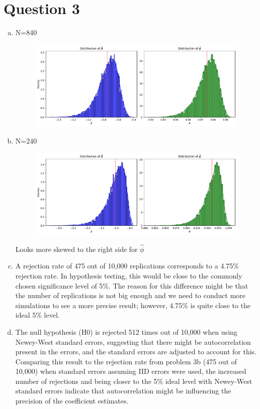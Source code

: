 
\section*{Question 3}

\begin{enumerate}[(a)]
    \item
    N=840\\
    \begin{figure}[h]
        \centering
        \includegraphics[width=0.9\linewidth]{Out/EX3-1.pdf}
        
    \end{figure}

  \item
    N=240\\
    \begin{figure}[h]
        \centering
        \includegraphics[width=0.9\linewidth]{Out/EX3-2.pdf}
        
    \end{figure}
Looks more skewed to the right side for $\hat{\phi}$
\item 
A rejection rate of 475 out of 10,000 replications corresponds to a 4.75\% rejection rate. In hypothesis testing, this would be close to the commonly chosen significance level of 5\%. The reason for this difference might be that the number of replications is not big enough and we need to conduct more simulations to see a more precise result; however, 4.75\% is quite close to the ideal 5\% level.

\item 
The null hypothesis (H0) is rejected 512 times out of 10,000 when using Newey-West standard errors, suggesting that there might be autocorrelation present in the errors, and the standard errors are adjusted to account for this.\\

Comparing this result to the rejection rate from problem 3b (475 out of 10,000) when standard errors assuming IID errors were used, the increased number of rejections and being closer to the 5\% ideal level with Newey-West standard errors indicate that autocorrelation might be influencing the precision of the coefficient estimates.
\end{enumerate}
